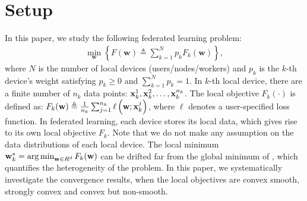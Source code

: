 

\section{Setup}


In this paper, we study the following federated learning problem:
\begin{align}
	\min _{\mathbf{w}}\left\{F(\mathbf{w}) \triangleq \sum\nolimits_{k=1}^{N} p_{k} F_{k}(\mathbf{w})\right\},
	\label{eq:problem}
\end{align}
where $N$ is the number of local devices (users/nodes/workers) and $p_k$ is the $k$-th device's weight satisfying $p_k \geq 0$ and $\sum_{k=1}^N p_k = 1$. 
In $k$-th local device, there are a finite number of $n_k$ data points:
${\mathbf{x}}_k^1, {\mathbf{x}}_k^2, \dots, {\mathbf{x}}_k^{n_k}$.  
The local objective $F_k(\cdot)$ is defined as:
$F_{k}(\mathbf{w}) \triangleq \frac{1}{n_{k}} \sum_{j=1}^{n_{k}} \ell\left(\mathbf{w} ; {\mathbf{x}}_k^j\right)$,
where $\ell$ denotes a user-specified loss function. In federated learning, each device stores its local data, which gives rise to its own local objective $F_k$. Note that we do not make any assumption on the
data distributions of each local device. The local minimum
${\mathbf{w}}^{*}_k= \operatorname*{arg\,min}_{{\mathbf{w}} \in R^d} F_k({\mathbf{w}})$ can be drifted far from
the global minimum of \eq{\ref{eq:problem}}, which quantifies the 
heterogeneity of the problem.
In this paper, we systematically investigate the convergence results, 
when the local objectives are convex smooth, strongly convex and convex but
non-smooth.



